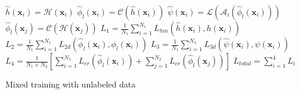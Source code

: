 \documentclass[final]{cvpr}
\begin{document}
\begin{algorithm}
	\footnotesize
	\SetAlgoLined
	{$\hat{h}(\mathbf{x}_i) = \mathcal{H}(\mathbf{x}_i)$\; $\hat{\phi}_l(\mathbf{x}_i) = \mathcal{C}(\hat{h}(\mathbf{x}_i))$\; $\hat{\psi}(\mathbf{x}_i) = \mathcal{L}(\mathcal{A}_i(\hat{\phi}_l(\mathbf{x}_i)))$\;}
	{$\hat{\phi}_l(\mathbf{x}_j) = \mathcal{C}(\mathcal{H}(\mathbf{x}_j))$\;}
	$L_{1} = \frac{1}{N_1}\sum_{i=1}^{N_1}L_{hm}(\hat{h}(\mathbf{x}_i), h(\mathbf{x}_i))$\;  
	$L_2 = \frac{1}{N_1}\sum_{i=1}^{N_1}L_{2d}(\hat{\phi}_l(\mathbf{x}_i), \phi_l(\mathbf{x}_i))$\; 
	$L_3 = \frac{1}{N_1}\sum_{i=1}^{N_1}L_{3d}(\hat{\psi}(\mathbf{x}_i), \psi(\mathbf{x}_i))$\;	 
	$L_4 = \frac{1}{N_1 + N_2}[\sum_{i=1}^{N_1}L_{cr}(\hat{\phi}_l(\mathbf{x}_i))
		+ \sum_{j=1}^{N_2}L_{cr}(\hat{\phi}_l(\mathbf{x}_j))]$\; 			
	$L_{total} = \sum_{i=1}^{4}L_i$	
\caption{Mixed training with unlabeled data}
\label{alg:loss}
\end{algorithm}
\end{document}
